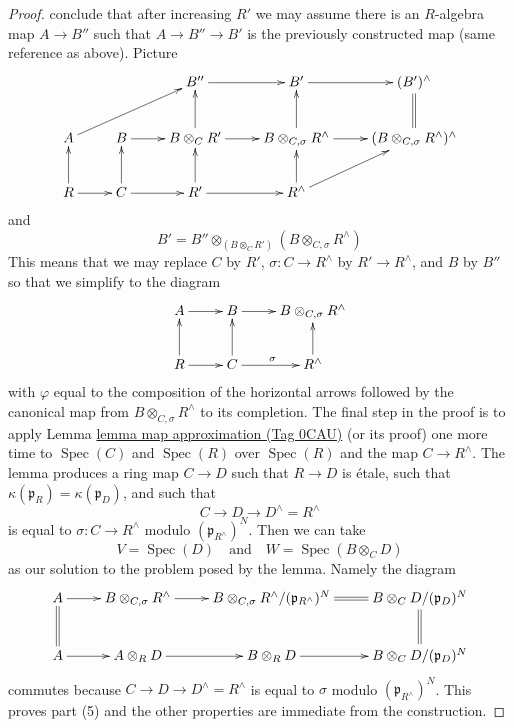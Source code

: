 \documentclass{amsart}
\theoremstyle{plain}
\theoremstyle{definition}
\theoremstyle{remark}
\numberwithin{equation}{subsection}
\def\Spec{\mathop{\mathrm{Spec}}}
\begin{document}
\begin{proof}
conclude that after increasing $R'$ we may assume there is
an $R$-algebra map $A \to B''$ such that $A \to B'' \to B'$ is
the previously constructed map (same reference as above). Picture
$$
\xymatrix{
& & B'' \ar[r] & B' \ar[r] & (B')^\wedge \ar@{=}[d] \\
A \ar[rru] &
B \ar[r] &
B \otimes_C R' \ar[r] \ar[u] &
B \otimes_{C, \sigma} R^\wedge \ar[r] \ar[u] &
(B \otimes_{C, \sigma} R^\wedge)^\wedge \\
R \ar[r] \ar[u] &
C \ar[r] \ar[u] &
R' \ar[r] \ar[u] &
R^\wedge \ar[u] \ar[ru]
}
$$
and
$$
B' = B'' \otimes_{(B \otimes_C R')} (B \otimes_{C, \sigma} R^\wedge)
$$
This means that we may replace $C$ by $R'$, $\sigma : C \to R^\wedge$ by
$R' \to R^\wedge$, and $B$ by $B''$ so that we simplify to the diagram
$$
\xymatrix{
A \ar[r] &
B \ar[r] &
B \otimes_{C, \sigma} R^\wedge \\
R \ar[r] \ar[u] &
C \ar[r]^\sigma \ar[u] & R^\wedge \ar[u]
}
$$
with $\varphi$ equal to the composition of the horizontal arrows
followed by the canonical map from $B \otimes_{C, \sigma} R^\wedge$
to its completion.
The final step in the proof is to apply Lemma \href{https://stacks.math.columbia.edu/tag/0CAU}{lemma map approximation (Tag 0CAU)}
(or its proof)
one more time to $\Spec(C)$ and $\Spec(R)$ over $\Spec(R)$ and the map
$C \to R^\wedge$. The lemma produces a ring map $C \to D$
such that $R \to D$ is \'etale, such that
$\kappa(\mathfrak p_R) = \kappa(\mathfrak p_D)$, and such that
$$
C \to D \to D^\wedge = R^\wedge
$$
is equal to $\sigma : C \to R^\wedge$ modulo $(\mathfrak p_{R^\wedge})^N$.
Then we can take
$$
V = \Spec(D)
\quad\text{and}\quad
W = \Spec(B \otimes_C D)
$$
as our solution to the problem posed by the lemma. Namely the diagram
$$
\xymatrix{
A \ar[r] &
B \otimes_{C, \sigma} R^\wedge \ar[r] &
B \otimes_{C, \sigma} R^\wedge/(\mathfrak p_{R^\wedge})^N \ar@{=}[r] &
B \otimes_C D/(\mathfrak p_D)^N \\
A \ar@{=}[u] \ar[r] &
A \otimes_R D \ar[r] &
B \otimes_R D \ar[r] &
B \otimes_C D/(\mathfrak p_D)^N \ar@{=}[u]
}
$$
commutes because $C \to D \to D^\wedge = R^\wedge$ is equal to
$\sigma$ modulo $(\mathfrak p_{R^\wedge})^N$. This proves part (5)
and the other properties are immediate from the construction.
\end{proof}
\end{document}
